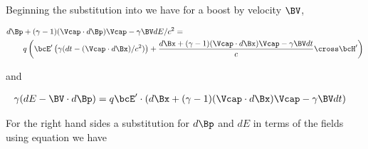 %
%
%
%
%
%
%
%

Beginning the substitution into  we have for a boost by velocity \(\BV\),

\begin{equation}\label{eqn:lorentz_force_tx_2:20}
\begin{aligned}
d\Bp &+ (\gamma-1)(\Vcap \cdot d\Bp) \Vcap - \gamma \BV dE/c^2 = \\
&q \left( \bcE' \left(\gamma ( dt - (\Vcap \cdot d\Bx )/c^2 )\right) + \frac{d\Bx + (\gamma-1)(\Vcap \cdot d\Bx) \Vcap - \gamma \BV dt}{c} \cross \bcH' \right)  \\
\end{aligned}
\end{equation}

and

\begin{equation}\label{eqn:lorentz_force_tx_2:40}
\begin{aligned}
\gamma ( dE - \BV \cdot d\Bp ) &= q \bcE' \cdot \left(d\Bx + (\gamma-1)(\Vcap \cdot d\Bx) \Vcap - \gamma \BV dt\right)
\end{aligned}
\end{equation}

For the right hand sides a substitution for \(d\Bp\) and \(dE\) in terms of the fields using equation
 we have


